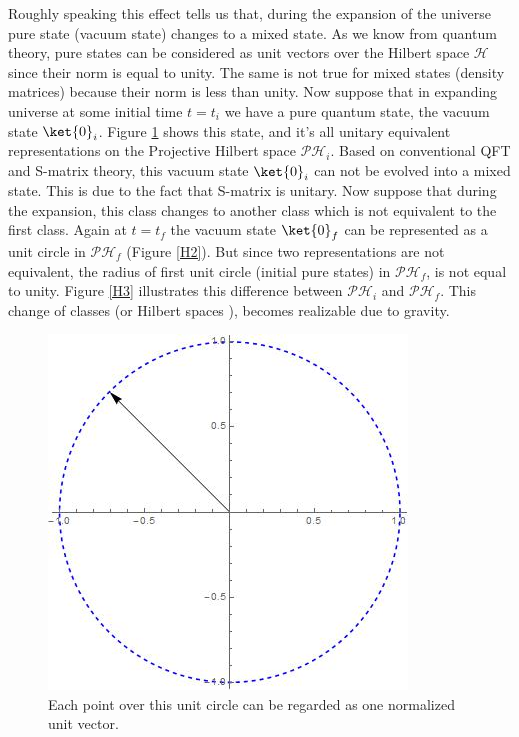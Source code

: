 \documentclass[12pt,a4paper]{article}
\begin{document}
Roughly speaking this effect tells us that, during the expansion of the universe pure state (vacuum state) changes to a mixed state. As we know from quantum theory, pure states can be considered as unit vectors over the Hilbert space $\mathcal{H}$ since their norm is equal to unity. The same is not true for mixed states (density matrices) because their norm is less than unity.  Now suppose that in expanding universe at some initial time $t=t_i$ we have a pure quantum state, the vacuum state $\ket {0}_i$. Figure \ref{H1}  shows this state, and it's all unitary equivalent representations on the Projective Hilbert space $\mathcal{PH}_i$. Based on conventional QFT and S-matrix theory, this vacuum state $\ket {0}_i$ can not be evolved into a mixed state. This is due to the fact that S-matrix is unitary. Now suppose that during the expansion, this class changes to another class which is not equivalent to the first class. Again at $t=t_f$ the vacuum state  $\ket {0}_f$  can be represented as a unit circle in  $\mathcal{PH}_f$ (Figure \ref{H2}). But since two representations are not equivalent, the radius of first unit circle (initial pure states) in $\mathcal{PH}_f$, is not equal to unity. Figure \ref{H3} illustrates this difference between $\mathcal{PH}_i$ and $\mathcal{PH}_f$. This change of classes (or Hilbert spaces ), becomes realizable due to gravity.   
\begin{figure}
  \includegraphics[width=\linewidth]{Hilbert1.jpg}
  \caption{Each point over this unit circle can be regarded as one normalized unit vector. }
  \label{H1}
\end{figure}
\end{document}
